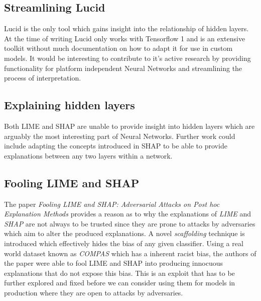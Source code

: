 \subsection{Streamlining Lucid}
Lucid is the only tool which gains insight into the relationship of hidden layers. At the time of writing Lucid only works with Tensorflow 1 and is an extensive toolkit without much documentation on how to adapt it for use in custom models. It would be interesting to contribute to it's active research by providing functionality for platform independent Neural Networks and streamlining the process of interpretation.
\subsection{Explaining hidden layers}
Both LIME and SHAP are unable to provide insight into hidden layers which are arguably the most interesting part of Neural Networks. Further work could include adapting the concepts introduced in SHAP to be able to provide explanations between any two layers within a network.
\subsection{Fooling LIME and SHAP}
The paper \emph{Fooling LIME and SHAP: Adversarial Attacks on Post hoc Explanation Methods} \cite{slack2020fooling} provides a reason as to why the explanations of \emph{LIME} and \emph{SHAP} are not always to be trusted since they are prone to attacks by adversaries which aim to alter the produced explanations. A novel \emph{scaffolding} technique is introduced which effectively hides the bias of any given classifier. Using a real world dataset known as \emph{COMPAS} which has a inherent racist bias, the authors of the paper were able to fool LIME and SHAP into producing innocuous explanations that do not expose this bias. This is an exploit that has to be further explored and fixed before we can consider using them for models in production where they are open to attacks by adversaries.